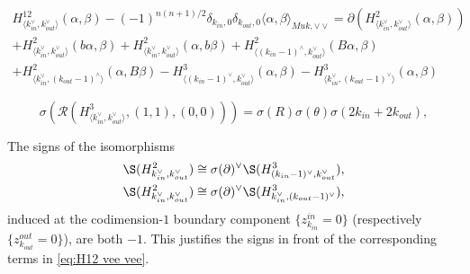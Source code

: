 \documentclass[10pt,a4paper]{amsart}
\def\cR{\mathcal{R}}
\def\signn{{n(n+1)/2}}
\begin{document}
    \begin{multline}\label{eq:H12 vee vee}
        H^{12}_{\langle k^\vee_{in},k^\vee_{out}\rangle}(\alpha,\beta) - (-1)^\signn\delta_{k_{in},0}\delta_{k_{out},0} \langle \alpha,\beta \rangle_{Muk,\vee\vee} = \partial(H^2_{\langle k^\vee_{in},k^\vee_{out}\rangle}(\alpha,\beta)) \\+ H^2_{\langle k^\vee_{in},k^\vee_{out}\rangle}(b\alpha,\beta) + H^2_{\langle k^\vee_{in},k^\vee_{out}\rangle}(\alpha,b\beta) + H^2_{\langle (k_{in}-1)^\wedge,k^\vee_{out}\rangle}(B\alpha,\beta) \\+ H^2_{\langle k^\vee_{in},(k_{out}-1)^\wedge\rangle}(\alpha,B\beta) - H^3_{\langle (k_{in}-1)^\vee,k^\vee_{out}\rangle}(\alpha,\beta) - H^3_{\langle k^\vee_{in},(k_{out}-1)^\vee\rangle}(\alpha,\beta)
    \end{multline}

\begin{equation}\label{eq:RH3 or}
    \sigma(\cR(H^3_{\langle k_{in}^\vee,k_{out}^\vee\rangle},(1,1),(0,0))) = \sigma(R)\sigma(\theta)\sigma(2k_{in}+2k_{out}),
\end{equation}

\begin{lem}
    The signs of the isomorphisms
    \begin{align*}
    \S(H^2_{k_{in}^\vee,k_{out}^\vee}) & \cong \sigma(\partial)^\vee \S(H^3_{(k_{in}-1)^\vee,k_{out}^\vee}),\\
    \S(H^2_{k_{in}^\vee,k_{out}^\vee}) &\cong \sigma(\partial)^\vee \S(H^3_{k_{in}^\vee,(k_{out}-1)^\vee}),
    \end{align*}
    induced at the codimension-$1$ boundary component $\{z^{in}_{k_{in}}=0\}$ (respectively $\{z^{out}_{k_{out}} = 0\}$), are both $-1$. 
    This justifies the signs in front of the corresponding terms in \eqref{eq:H12 vee vee}.
\end{lem}
\end{document}
